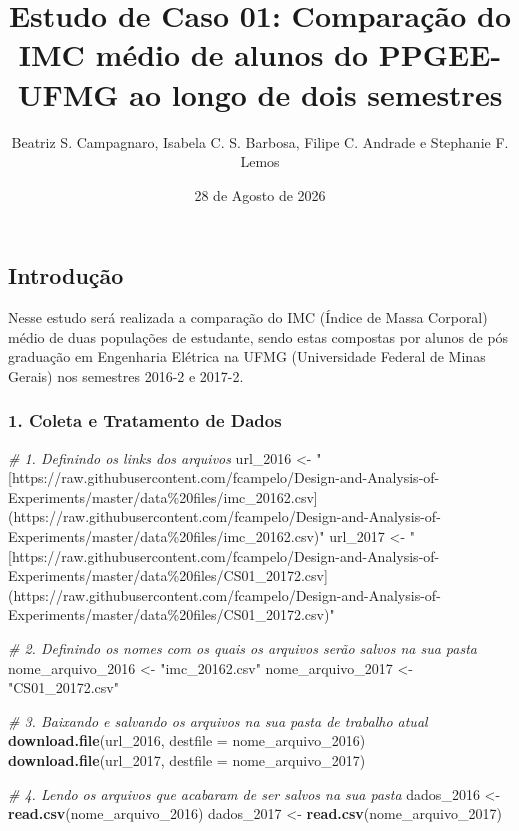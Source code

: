\documentclass[
]{article}
\title{Estudo de Caso 01: Comparação do IMC médio de alunos do
PPGEE-UFMG ao longo de dois semestres}
\author{Beatriz S. Campagnaro, Isabela C. S. Barbosa, Filipe C. Andrade
e Stephanie F. Lemos}
\date{28 de Agosto de 2026}
\newenvironment{Shaded}{\begin{snugshade}}{\end{snugshade}}
\newcommand{\AttributeTok}[1]{\textcolor[rgb]{0.13,0.29,0.53}{#1}}
\newcommand{\CommentTok}[1]{\textcolor[rgb]{0.56,0.35,0.01}{\textit{#1}}}
\newcommand{\FunctionTok}[1]{\textcolor[rgb]{0.13,0.29,0.53}{\textbf{#1}}}
\newcommand{\NormalTok}[1]{#1}
\newcommand{\OtherTok}[1]{\textcolor[rgb]{0.56,0.35,0.01}{#1}}
\newcommand{\StringTok}[1]{\textcolor[rgb]{0.31,0.60,0.02}{#1}}
\begin{document}
\maketitle

\subsection{Introdução}\label{introduuxe7uxe3o}

Nesse estudo será realizada a comparação do IMC (Índice de Massa
Corporal) médio de duas populações de estudante, sendo estas compostas
por alunos de pós graduação em Engenharia Elétrica na UFMG (Universidade
Federal de Minas Gerais) nos semestres 2016-2 e 2017-2.

\subsubsection{1. Coleta e Tratamento de
Dados}\label{coleta-e-tratamento-de-dados}

\begin{Shaded}
\begin{Highlighting}[]
\CommentTok{\# 1. Definindo os links dos arquivos}
\NormalTok{url\_2016 }\OtherTok{\textless{}{-}} \StringTok{"[https://raw.githubusercontent.com/fcampelo/Design{-}and{-}Analysis{-}of{-}Experiments/master/data\%20files/imc\_20162.csv](https://raw.githubusercontent.com/fcampelo/Design{-}and{-}Analysis{-}of{-}Experiments/master/data\%20files/imc\_20162.csv)"}
\NormalTok{url\_2017 }\OtherTok{\textless{}{-}} \StringTok{"[https://raw.githubusercontent.com/fcampelo/Design{-}and{-}Analysis{-}of{-}Experiments/master/data\%20files/CS01\_20172.csv](https://raw.githubusercontent.com/fcampelo/Design{-}and{-}Analysis{-}of{-}Experiments/master/data\%20files/CS01\_20172.csv)"}

\CommentTok{\# 2. Definindo os nomes com os quais os arquivos serão salvos na sua pasta}
\NormalTok{nome\_arquivo\_2016 }\OtherTok{\textless{}{-}} \StringTok{"imc\_20162.csv"}
\NormalTok{nome\_arquivo\_2017 }\OtherTok{\textless{}{-}} \StringTok{"CS01\_20172.csv"}

\CommentTok{\# 3. Baixando e salvando os arquivos na sua pasta de trabalho atual}
\FunctionTok{download.file}\NormalTok{(url\_2016, }\AttributeTok{destfile =}\NormalTok{ nome\_arquivo\_2016)}
\FunctionTok{download.file}\NormalTok{(url\_2017, }\AttributeTok{destfile =}\NormalTok{ nome\_arquivo\_2017)}

\CommentTok{\# 4. Lendo os arquivos que acabaram de ser salvos na sua pasta}
\NormalTok{dados\_2016 }\OtherTok{\textless{}{-}} \FunctionTok{read.csv}\NormalTok{(nome\_arquivo\_2016)}
\NormalTok{dados\_2017 }\OtherTok{\textless{}{-}} \FunctionTok{read.csv}\NormalTok{(nome\_arquivo\_2017)}
\end{Highlighting}
\end{Shaded}
\end{document}
